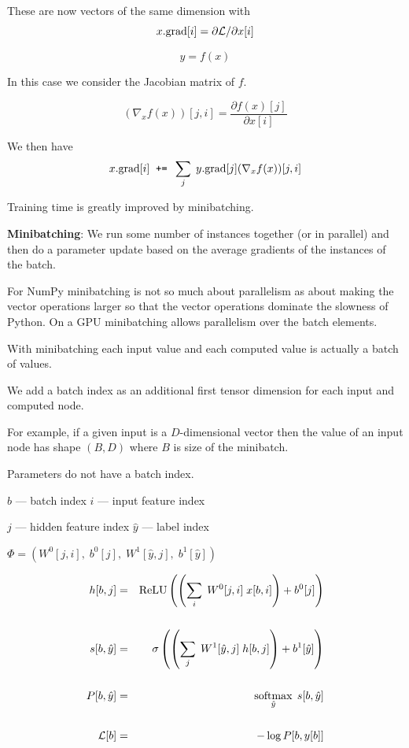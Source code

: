 {\vfill
These are now vectors of the same dimension with
$$x.\mathrm{grad}[i] = \partial {\cal L}/\partial x[i]$$


$$y = f(x)$$

\vfill

In this case we consider the Jacobian matrix of $f$.

$$(\nabla_x f(x))[j,i] = \frac{\partial f(x)[j]}{\partial x[i]}$$

\vfill
We then have
$$x.\mathrm{grad}[i]\;\; \mbox{\tt +=} \;\; \sum_j\;y.\mathrm{grad}[j] (\nabla_x f(x))[j,i]$$



Training time is greatly improved by minibatching.

 \vfill
{\bf Minibatching}: We run some number of instances together (or in parallel) and then do a parameter update based on the average
gradients of the instances of the batch.

\vfill
For NumPy minibatching is not so much about parallelism as about making the vector operations larger so that the vector operations dominate
the slowness of Python.  On a GPU minibatching allows parallelism over the batch elements.
\vfill

\vfill
With minibatching each input value and each computed value is actually a batch of values.

\vfill
We add a batch index as an additional first tensor dimension for each input and computed node.

\vfill
For example, if a given input is a $D$-dimensional vector then the value of an input node
has shape $(B,D)$ where $B$ is size of the minibatch.

\vfill
Parameters do not have a batch index.


{\huge
\centerline{$b$ --- batch index \hspace{1ex} $i$ --- input feature index}
\centerline{$j$ --- hidden feature index \hspace{1ex} $\hat{y}$ --- label index}
\vfill
\centerline{$\Phi = (W^0[j,i],\;b^0[j],\;W^1[\hat{y},j],\;b^1[\hat{y}])$}
}

\vfill
\begin{eqnarray*}
  h[b,j] & = & \mathrm{ReLU}\left(\left(\sum_i\;W^0[j,i] \;x[b,i]\right) + b^0[j]\right) \\
  \\
  s[b,\hat{y}] & = & \sigma\left(\left(\sum_j\;W^1[\hat{y},j]\;h[b,j]\right) + b^1[\hat{y}]\right) \\
  \\
  P[b,\hat{y}] & = & \operatorname*{softmax}_{\hat{y}}\;s[b,\hat{y}] \\
  \\
  {\cal L}[b] & = & - \log P[b,y[b]]
\end{eqnarray*}

}

